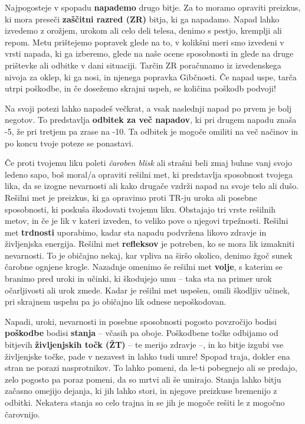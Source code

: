 Najpogosteje v spopadu \textbf{napademo} drugo bitje. Za to moramo opraviti preizkus, ki mora preseči \textbf{zaščitni razred (ZR)} bitja, ki ga napadamo. Napad lahko izvedemo z orožjem, urokom ali celo deli telesa, denimo s pestjo, kremplji ali repom. Metu prištejemo popravek glede na to, v kolikšni meri smo izvedeni v vrsti napada, ki ga izberemo, glede na naše ocene sposobnosti in glede na druge prištevke ali odbitke v dani situaciji. Tarčin ZR poračunamo iz izvedenskega nivoja za oklep, ki ga nosi, in njenega popravka Gibčnosti. Če napad uspe, tarča utrpi poškodbe, in če dosežemo skrajni uspeh, se količina poškodb podvoji!

Na svoji potezi lahko napadeš večkrat, a vsak naslednji napad po prvem je bolj negotov. To predstavlja \textbf{odbitek za več napadov}, ki pri drugem napadu znaša -5, že pri tretjem pa zrase na -10. Ta odbitek je mogoče omiliti na več načinov in po koncu tvoje poteze se ponastavi.

Če proti tvojemu liku poleti \textit{čaroben blisk} ali strašni beli zmaj buhne vanj svojo ledeno sapo, boš moral/a opraviti rešilni met, ki predstavlja sposobnost tvojega lika, da se izogne nevarnosti ali kako drugače vzdrži napad na svoje telo ali dušo. Rešilni met je preizkus, ki ga opravimo proti TR-ju uroka ali posebne sposobnosti, ki poskuša škodovati tvojemu liku. Obstajajo tri vrste rešilnih metov, in če je lik v kateri izveden, to veliko pove o njegovi trpežnosti. Rešilni met \textbf{trdnosti} uporabimo, kadar sta napadu podvržena likovo zdravje in življenjska energija. Rešilni met \textbf{refleksov} je potreben, ko se mora lik izmakniti nevarnosti. To je običajno nekaj, kar vpliva na širšo okolico, denimo žgoč sunek čarobne ognjene krogle. Nazadnje omenimo še rešilni met \textbf{volje}, s katerim se branimo pred uroki in učinki, ki škodujejo umu -- taka sta na primer urok očarljivosti ali urok zmede. Kadar je rešilni met uspešen, omili škodljiv učinek, pri skrajnem uspehu pa jo običajno lik odnese nepoškodovan.

Napadi, uroki, nevarnosti in posebne sposobnosti pogosto povzročijo bodisi \textbf{poškodbe} bodisi \textbf{stanja} -- včasih pa oboje. Poškodbene točke odbijamo od bitjevih \textbf{življenjskih točk (ŽT)} -- te merijo zdravje --, in ko bitje izgubi vse življenjske točke, pade v nezavest in lahko tudi umre! Spopad traja, dokler ena stran ne porazi nasprotnikov. To lahko pomeni, da le-ti pobegnejo ali se predajo, zelo pogosto pa poraz pomeni, da so mrtvi ali še umirajo. Stanja lahko bitju začasno omejijo dejanja, ki jih lahko stori, in njegove preizkuse bremenijo z odbitki. Nekatera stanja so celo trajna in se jih je mogoče rešiti le z mogočno čarovnijo.

